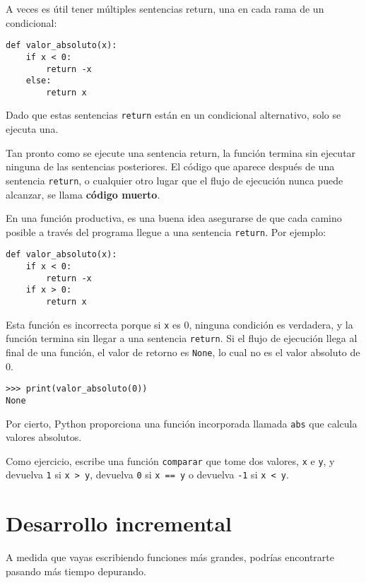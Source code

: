 \documentclass[10pt]{book}
\begin{document}
A veces es útil tener múltiples sentencias return, una en cada
rama de un condicional:

\begin{verbatim}
def valor_absoluto(x):
    if x < 0:
        return -x
    else:
        return x
\end{verbatim}
%
Dado que estas sentencias {\tt return} están en un condicional alternativo,
solo se ejecuta una.

Tan pronto como se ejecute una sentencia return, la función
termina sin ejecutar ninguna de las sentencias posteriores.
El código que aparece después de una sentencia {\tt return}, o cualquier otro lugar
que el flujo de ejecución nunca puede alcanzar, se llama
{\bf código muerto}.

En una función productiva, es una buena idea asegurarse de
que cada camino posible a través del programa llegue a una
sentencia {\tt return}.  Por ejemplo:

\begin{verbatim}
def valor_absoluto(x):
    if x < 0:
        return -x
    if x > 0:
        return x
\end{verbatim}
%
Esta función es incorrecta porque si {\tt x} es 0,
ninguna condición es verdadera, y la función termina sin llegar a una
sentencia {\tt return}.  Si el flujo de ejecución llega al final
de una función, el valor de retorno es {\tt None}, lo cual no es
el valor absoluto de 0.

\begin{verbatim}
>>> print(valor_absoluto(0))
None
\end{verbatim}
%
Por cierto, Python proporciona una función incorporada llamada
{\tt abs} que calcula valores absolutos.

Como ejercicio, escribe una función {\tt comparar} que
tome dos valores, {\tt x} e {\tt y}, y devuelva {\tt 1} si {\tt x > y},
devuelva {\tt 0} si {\tt x == y} o devuelva {\tt -1} si {\tt x < y}.


\section{Desarrollo incremental}
\label{incremental.development}

A medida que vayas escribiendo funciones más grandes, podrías encontrarte
pasando más tiempo depurando.
\end{document}
